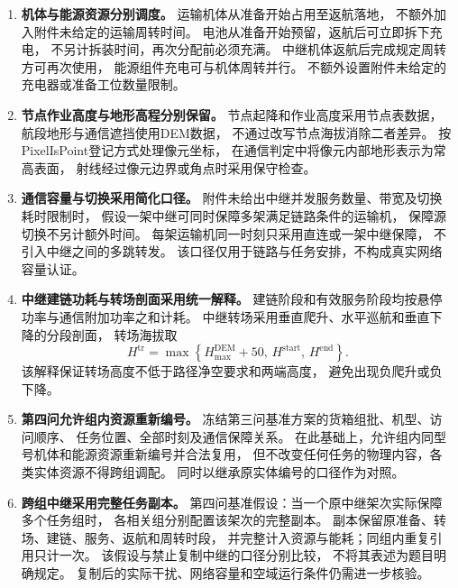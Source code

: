 \documentclass[bwprint]{gmcmthesis}
\begin{document}
\begin{enumerate}
    \item \textbf{机体与能源资源分别调度。}
    运输机体从准备开始占用至返航落地，
    不额外加入附件未给定的运输周转时间。
    电池从准备开始预留，返航后可立即拆下充电，
    不另计拆装时间，再次分配前必须充满。
    中继机体返航后完成规定周转方可再次使用，
    能源组件充电可与机体周转并行。
    不额外设置附件未给定的充电器或准备工位数量限制。

    \item \textbf{节点作业高度与地形高程分别保留。}
    节点起降和作业高度采用节点表数据，
    航段地形与通信遮挡使用DEM数据，
    不通过改写节点海拔消除二者差异。
    按PixelIsPoint登记方式处理像元坐标，
    在通信判定中将像元内部地形表示为常高表面，
    射线经过像元边界或角点时采用保守检查。

    \item \textbf{通信容量与切换采用简化口径。}
    附件未给出中继并发服务数量、带宽及切换耗时限制时，
    假设一架中继可同时保障多架满足链路条件的运输机，
    保障源切换不另计额外时间。
    每架运输机同一时刻只采用直连或一架中继保障，
    不引入中继之间的多跳转发。
    该口径仅用于链路与任务安排，不构成真实网络容量认证。

    \item \textbf{中继建链功耗与转场剖面采用统一解释。}
    建链阶段和有效服务阶段均按悬停功率与通信附加功率之和计耗。
    中继转场采用垂直爬升、水平巡航和垂直下降的分段剖面，
    转场海拔取
    \begin{equation}
        H^{\mathrm{tr}}
        =
        \max\left\{
        H^{\mathrm{DEM}}_{\max}+50,\,
        H^{\mathrm{start}},\,
        H^{\mathrm{end}}
        \right\}.
    \end{equation}
    该解释保证转场高度不低于路径净空要求和两端高度，
    避免出现负爬升或负下降。

    \item \textbf{第四问允许组内资源重新编号。}
    冻结第三问基准方案的货箱组批、机型、访问顺序、
    任务位置、全部时刻及通信保障关系。
    在此基础上，允许组内同型号机体和能源资源重新编号并合法复用，
    但不改变任何任务的物理内容，各类实体资源不得跨组调配。
    同时以继承原实体编号的口径作为对照。

    \item \textbf{跨组中继采用完整任务副本。}
    第四问基准假设：当一个原中继架次实际保障多个任务组时，
    各相关组分别配置该架次的完整副本。
    副本保留原准备、转场、建链、服务、返航和周转时段，
    并完整计入资源与能耗；同组内重复引用只计一次。
    该假设与禁止复制中继的口径分别比较，
    不将其表述为题目明确规定。
    复制后的实际干扰、网络容量和空域运行条件仍需进一步核验。

\end{enumerate}
\end{document}

